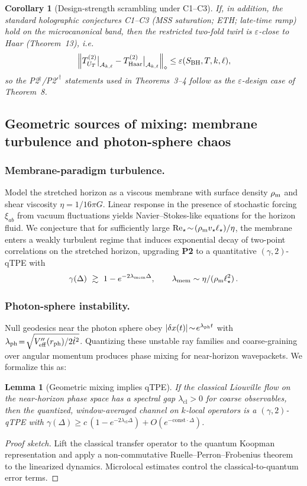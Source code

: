 \documentclass[aps,prd,preprint,onecolumn,superscriptaddress,nofootinbib,longbibliography,floatfix,11pt,showpacs,showkeys]{revtex4-2}
\newcommand{\Ptwo}{\textbf{P2}\xspace}
\theoremstyle{plain}
\newtheorem{lemma}[theorem]{Lemma}
\newtheorem{corollary}[theorem]{Corollary}
\theoremstyle{definition}
\theoremstyle{remark}
\begin{document}
\begin{corollary}[Design-strength scrambling under C1--C3]\label{cor:A3-design}
If, in addition, the standard holographic conjectures C1--C3 (MSS saturation; ETH; late-time ramp) hold on the microcanonical band, then the restricted two-fold twirl is $\varepsilon$-close to Haar (Theorem~13), i.e.
\[
\left\| T^{(2)}_{U_T}\big|_{\mathcal A_{k,\ell}} - T^{(2)}_{\mathrm{Haar}}\big|_{\mathcal A_{k,\ell}}\right\|_\diamond \le \varepsilon(S_{\rm BH},T,k,\ell),
\]
so the P2$^\dagger$/P2$'^\dagger$ statements used in Theorems~3--4 follow as the $\varepsilon$-design case of Theorem~8.
\end{corollary}


\subsection*{Geometric sources of mixing: membrane turbulence and photon-sphere chaos}
\label{sec:geom-mix}
\subsubsection{Membrane-paradigm turbulence.}
Model the stretched horizon as a viscous membrane with surface density $\rho_{\rm m}$ and shear viscosity $\eta=1/16\pi G$.
Linear response in the presence of stochastic forcing $\xi_{ab}$ from vacuum fluctuations yields Navier--Stokes-like equations for the horizon fluid.
We conjecture that for sufficiently large $\mathrm{Re}_\star\!\sim\!(\rho_{\rm m} v_\star \ell_\star)/\eta$, the membrane enters a weakly turbulent regime that induces exponential decay of two-point correlations on the stretched horizon, upgrading \Ptwo{} to a quantitative $(\gamma,2)$-qTPE with
\begin{equation}
\gamma(\Delta)\ \gtrsim\ 1-e^{-2\lambda_{\rm mem}\Delta},\qquad \lambda_{\rm mem}\sim \eta/(\rho_{\rm m}\ell_\star^2)\,.
\end{equation}
\subsubsection{Photon-sphere instability.}
Null geodesics near the photon sphere obey $|\delta x(t)|\!\sim\! e^{\lambda_{\rm ph} t}$ with $\lambda_{\rm ph}\!=\!\sqrt{V''_{\rm eff}(r_{\rm ph})/2\dot{t}^2}$.
Quantizing these unstable ray families and coarse-graining over angular momentum produces phase mixing for near-horizon wavepackets.
We formalize this as:
\begin{lemma}[Geometric mixing implies qTPE]
If the classical Liouville flow on the near-horizon phase space has a spectral gap $\lambda_\mathrm{cl}>0$ for coarse observables, then the quantized, window-averaged channel on $k$-local operators is a $(\gamma,2)$-qTPE with $\gamma(\Delta)\!\ge\! c\,(1-e^{-2\lambda_\mathrm{cl}\Delta})+O(e^{-\mathrm{const}\cdot \Delta})$.
\end{lemma}
\begin{proof}[Proof sketch]
Lift the classical transfer operator to the quantum Koopman representation and apply a non-commutative Ruelle--Perron--Frobenius theorem to the linearized dynamics.
Microlocal estimates control the classical-to-quantum error terms.
\end{proof}
\end{document}

